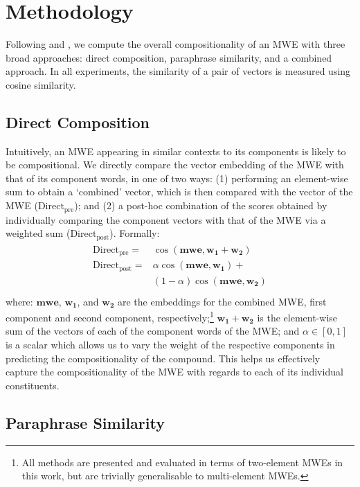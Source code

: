 \documentclass[11pt,a4paper]{article}
\newcommand{\method}[2][]{\ensuremath{\text{#2}_{\text{#1}}}\xspace}
\newcommand{\presum}{\method[pre]{Direct}}
\newcommand{\postsum}{\method[post]{Direct}}
\newcommand{\MWEvec}{\ensuremath{\mathbf{mwe}}\xspace}
\newcommand{\MWEonevec}{\ensuremath{\mathbf{w_1}}\xspace}
\newcommand{\MWEtwovec}{\ensuremath{\mathbf{w_2}}\xspace}
\begin{document}
\section{Methodology}

Following \citet{Salehi2015} and \citet{Nanda2018}, we compute the overall compositionality of an MWE with three broad approaches: direct composition, paraphrase similarity, and a combined approach. In all experiments, the similarity of a pair of vectors is measured using cosine similarity.

\subsection{Direct Composition}
\label{sec:direct}

Intuitively, an MWE appearing in similar contexts to its components is likely to be compositional. We directly compare the vector embedding of the MWE with that of its component words, in one of two ways: (1) performing an element-wise sum to obtain a `combined' vector, which is then compared with the vector of the MWE (\presum); and (2) a post-hoc combination of the scores obtained by individually comparing the component vectors with that of the MWE via a weighted sum (\postsum). Formally:
\begin{eqnarray*}
  \begin{split}
    \presum = & \cos(\MWEvec, \MWEonevec + \MWEtwovec)\\
    \postsum = & \alpha \cos(\MWEvec, \MWEonevec) + \\  
    & (1 - \alpha) \cos(\MWEvec, \MWEtwovec)\\
  \end{split}
\end{eqnarray*}
where: \MWEvec, \MWEonevec, and \MWEtwovec are the embeddings for the combined MWE, first component and second component, respectively;\footnote{All methods are presented and evaluated in terms of two-element MWEs in this work, but are trivially generalisable to multi-element MWEs.} $\MWEonevec + \MWEtwovec$ is the element-wise sum of the vectors of each of the component words of the MWE; and $\alpha \in [0,1]$ is a scalar which allows us to vary the weight of the respective components in predicting the compositionality of the compound. This helps us effectively capture the compositionality of the MWE with regards to each of its individual constituents.

\subsection{Paraphrase Similarity}
\label{sec:paraphrase}
\end{document}
